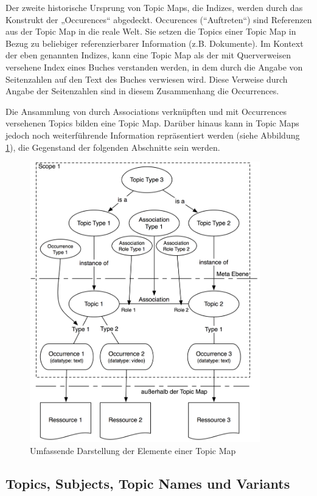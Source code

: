 Der zweite historische Ursprung von Topic Maps, die Indizes, werden durch das Konstrukt der „Occurences“ abgedeckt. Occurences (“Auftreten“) sind Referenzen aus der Topic Map in die reale Welt. Sie setzen die Topics einer Topic Map in Bezug zu beliebiger referenzierbarer Information (z.B. Dokumente). Im Kontext der eben genannten Indizes, kann eine Topic Map als der mit Querverweisen versehene Index eines Buches verstanden werden, in dem durch die Angabe von Seitenzahlen auf den Text des Buches verwiesen wird. Diese Verweise durch Angabe der Seitenzahlen sind in diesem Zusammenhang die Occurrences.

Die Ansammlung von durch Associations verknüpften und mit Occurrences versehenen Topics bilden eine Topic Map. Darüber hinaus kann in Topic Maps jedoch noch weiterführende Information repräsentiert werden (siehe Abbildung \ref{fig:img_Persistenz_TMFull}), die Gegenstand der folgenden Abschnitte sein werden.

\begin{figure}[htbp]
	\centering
		\includegraphics[width=10cm]{img/Persistenz/TMFull.png}
	\caption{Umfassende Darstellung der Elemente einer Topic Map}
	\label{fig:img_Persistenz_TMFull}
\end{figure}

\subsection{Topics, Subjects, Topic Names und Variants} %
\label{sub:topics_subjects_topic_names_und_variants}


